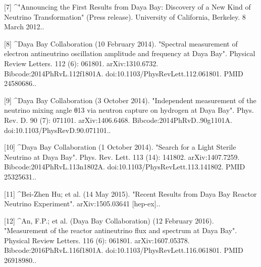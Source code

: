 [7]
^"Announcing the First Results from Daya Bay: Discovery of a New Kind of Neutrino Transformation" (Press release). University of California, Berkeley. 8 March 2012..

[8]
^Daya Bay Collaboration (10 February 2014). "Spectral measurement of electron antineutrino oscillation amplitude and frequency at Daya Bay". Physical Review Letters. 112 (6): 061801. arXiv:1310.6732. Bibcode:2014PhRvL.112f1801A. doi:10.1103/PhysRevLett.112.061801. PMID 24580686..

[9]
^Daya Bay Collaboration (3 October 2014). "Independent measurement of the neutrino mixing angle θ13 via neutron capture on hydrogen at Daya Bay". Phys. Rev. D. 90 (7): 071101. arXiv:1406.6468. Bibcode:2014PhRvD..90g1101A. doi:10.1103/PhysRevD.90.071101..

[10]
^Daya Bay Collaboration (1 October 2014). "Search for a Light Sterile Neutrino at Daya Bay". Phys. Rev. Lett. 113 (14): 141802. arXiv:1407.7259. Bibcode:2014PhRvL.113n1802A. doi:10.1103/PhysRevLett.113.141802. PMID 25325631..

[11]
^Bei-Zhen Hu; et al. (14 May 2015). "Recent Results from Daya Bay Reactor Neutrino Experiment". arXiv:1505.03641 [hep-ex]..

[12]
^An, F.P.; et al. (Daya Bay Collaboration) (12 February 2016). "Measurement of the reactor antineutrino flux and spectrum at Daya Bay". Physical Review Letters. 116 (6): 061801. arXiv:1607.05378. Bibcode:2016PhRvL.116f1801A. doi:10.1103/PhysRevLett.116.061801. PMID 26918980..